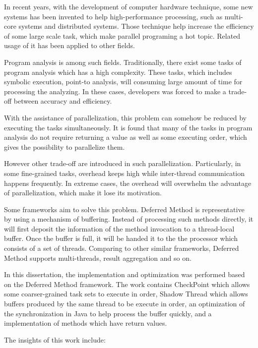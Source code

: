 \begin{englishabstract}

In recent years, with the development of computer hardware technique, some new systems has been invented to help high-performance processing, such as multi-core systems and distributed systems. Those technique help increase the efficiency of some large scale task, which make parallel programing a hot topic. Related usage of it has been applied to other fields.

Program analysis is among such fields. Traditionally, there exist some tasks of program analysis which has a high complexity. These tasks, which includes symbolic execution, point-to analysis, will consuming large amount of time for processing the analyzing. In these cases, developers was forced to make a trade-off between accuracy and efficiency.

With the assistance of parallelization, this problem can somehow be reduced by executing the tasks simultaneously. It is found that many of the tasks in program analysis do not require returning a value as well as some executing order, which gives the possibility to parallelize them.

However other trade-off are introduced in such parallelization. Particularly, in some fine-grained tasks, overhead keeps high while inter-thread communication happens frequently. In extreme cases, the overhead will overwhelm the advantage of parallelization, which make it lose its motivation.

Some frameworks aim to solve this problem. Deferred Method is representative by using a mechanism of buffering. Instead of processing such methods directly, it will first deposit the information of the method invocation to a thread-local buffer. Once the buffer is full, it will be handed it to the the processor which consists of a set of threads. Comparing to other similar frameworks, Deferred Method supports multi-threads, result aggregation and so on.

In this dissertation, the implementation and optimization was performed based on the Deferred Method framework. The work contains CheckPoint which allows some coarser-grained task sets to execute in order, Shadow Thread which allows buffers produced by the same thread to be execute in order, an optimization of the synchronization in Java to help process the buffer quickly, and a implementation of methods which have return values.

The insights of this work include:


\end{englishabstract}
